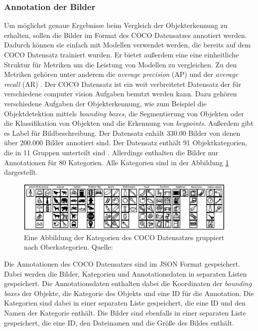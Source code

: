 \subsubsection{Annotation der Bilder}
Um möglichst genaue Ergebnisse beim Vergleich der Objekterkennung zu erhalten, sollen die Bilder im Format des COCO Datensatzes annotiert werden. Dadurch können sie einfach mit Modellen verwendet werden, die bereits auf dem COCO Datensatz trainiert wurden. Er bietet außerdem eine eine einheitliche Struktur für Metriken um die Leistung von Modellen zu vergleichen. Zu den Metriken gehören unter anderem die \emph{average precision} (AP) und der \emph{average recall} (AR) \cite{coco2015eval}.
Der COCO Datensatz ist ein weit verbreitetet Datensatz der für verschiedene computer vision Aufgaben benutzt werden kann. Dazu gehören verschiedene Aufgaben der Objekterkennung, wie zum Beispiel die Objektdetektion mittels \emph{bounding boxes}, die Segmentierung von Objekten oder die Klassifikation von Objekten und die Erkennung von \emph{keypoints}. Außerdem gibt es Label für Bildbeschreibung.
Der Datensatz enhält 330.00 Bilder von denen über 200.000 Bilder annotiert sind. Der Datensatz enthält 91 Objektkategorien, die in 11 Gruppen unterteilt sind \cite{coco2015}. Allerdings enthalten die Bilder nur Annotationen für 80 Kategorien. Alle Kategorien sind in der Abbildung \ref{fig:coco_categories} dargestellt. 
\begin{figure}
    \centering
    \includegraphics[width=0.95\textwidth]{bilder/fig-11-icons-of-91-categories-in-the-ms-coco-dataset-grouped-2cynvw3e.png}
    \caption{Eine Abbildung der Kategorien des COCO Datensatzes gruppiert nach Oberkategorien. Quelle: \cite[S.~13]{lin2015microsoftcococommonobjects}}
    \label{fig:coco_categories}
\end{figure}
Die Annotationen des COCO Datensatzes sind im JSON Format gespeichert. Dabei werden die Bilder, Kategorien und Annotationsdaten in separaten Listen gespeichert. Die Annotationsdaten enthalten dabei die Koordinaten der \emph{bounding boxes} der Objekte, die Kategorie des Objekts und eine ID für die Annotation. Die Kategorien sind dabei in einer separaten Liste gespeichert, die eine ID und den Namen der Kategorie enthält. Die Bilder sind ebenfalls in einer separaten Liste gespeichert, die eine ID, den Dateinamen und die Größe des Bildes enthält.

